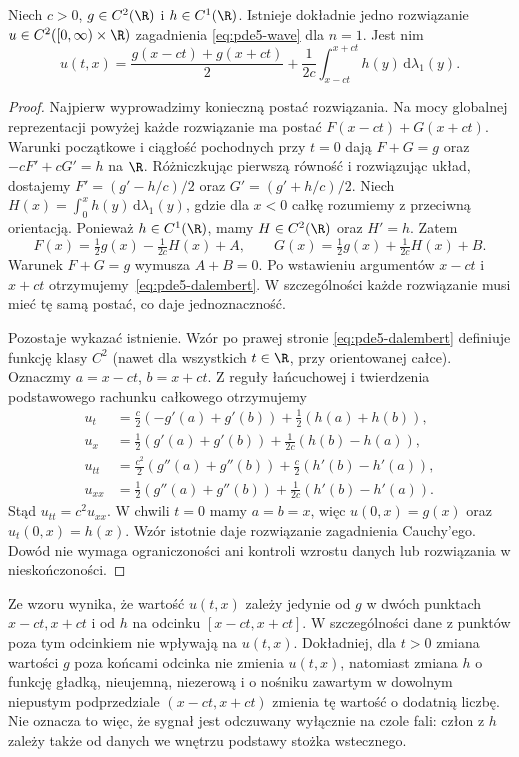 \begin{twierdzenie}\label{thm:pde5-dalembert}
Niech $c>0$, $g\in C^2(\R)$ i $h\in C^1(\R)$.
Istnieje dokładnie jedno rozwiązanie
$u\in C^2([0,\infty)\times\R)$ zagadnienia
\eqref{eq:pde5-wave} dla $n=1$. Jest nim
\begin{equation}\label{eq:pde5-dalembert}
 u(t,x)=\frac{g(x-ct)+g(x+ct)}2
 +\frac1{2c}\int_{x-ct}^{x+ct}h(y)\,\mathrm d\lambda_1(y).
\end{equation}
\end{twierdzenie}
\begin{proof}
Najpierw wyprowadzimy konieczną postać rozwiązania.
Na mocy globalnej reprezentacji powyżej każde
rozwiązanie ma postać $F(x-ct)+G(x+ct)$.
Warunki początkowe i ciągłość pochodnych przy $t=0$
dają $F+G=g$ oraz $-cF'+cG'=h$ na $\R$.
Różniczkując pierwszą równość i rozwiązując układ,
dostajemy $F'=(g'-h/c)/2$ oraz $G'=(g'+h/c)/2$.
Niech $H(x)=\int_0^x h(y)\,\mathrm d\lambda_1(y)$,
gdzie dla $x<0$ całkę rozumiemy z przeciwną orientacją.
Ponieważ $h\in C^1(\R)$, mamy $H\in C^2(\R)$
oraz $H'=h$. Zatem
\[
 F(x)=\tfrac12g(x)-\tfrac1{2c}H(x)+A,\qquad
 G(x)=\tfrac12g(x)+\tfrac1{2c}H(x)+B.
\]
Warunek $F+G=g$ wymusza $A+B=0$.
Po wstawieniu argumentów $x-ct$ i $x+ct$
otrzymujemy~\eqref{eq:pde5-dalembert}.
W szczególności każde rozwiązanie musi mieć
tę samą postać, co daje jednoznaczność.

Pozostaje wykazać istnienie. Wzór po prawej stronie
\eqref{eq:pde5-dalembert} definiuje funkcję klasy
$C^2$ (nawet dla wszystkich $t\in\R$, przy
orientowanej całce). Oznaczmy $a=x-ct$, $b=x+ct$.
Z reguły łańcuchowej i twierdzenia podstawowego
rachunku całkowego otrzymujemy
\[
 \begin{aligned}
 u_t&=\tfrac c2(-g'(a)+g'(b))+\tfrac12(h(a)+h(b)),\\
 u_x&=\tfrac12(g'(a)+g'(b))+\tfrac1{2c}(h(b)-h(a)),\\
 u_{tt}&=\tfrac{c^2}2(g''(a)+g''(b))
                   +\tfrac c2(h'(b)-h'(a)),\\
 u_{xx}&=\tfrac12(g''(a)+g''(b))
                   +\tfrac1{2c}(h'(b)-h'(a)).
 \end{aligned}
\]
Stąd $u_{tt}=c^2u_{xx}$. W chwili $t=0$ mamy
$a=b=x$, więc $u(0,x)=g(x)$ oraz $u_t(0,x)=h(x)$.
Wzór istotnie daje rozwiązanie zagadnienia Cauchy'ego.
Dowód nie wymaga ograniczoności ani kontroli wzrostu
danych lub rozwiązania w nieskończoności.
\end{proof}

\begin{uwaga}
Ze wzoru wynika, że wartość $u(t,x)$ zależy jedynie
od $g$ w dwóch punktach $x-ct,x+ct$ i od $h$ na
odcinku $[x-ct,x+ct]$. W szczególności dane z punktów
poza tym odcinkiem nie wpływają na $u(t,x)$.
Dokładniej, dla $t>0$ zmiana wartości $g$ poza
końcami odcinka nie zmienia $u(t,x)$, natomiast
zmiana $h$ o funkcję gładką, nieujemną, niezerową
i o nośniku zawartym w dowolnym niepustym
podprzedziale $(x-ct,x+ct)$ zmienia tę wartość
o dodatnią liczbę. Nie oznacza to więc, że
sygnał jest odczuwany wyłącznie na czole fali:
człon z $h$ zależy także od danych we wnętrzu
podstawy stożka wstecznego.
\end{uwaga}

